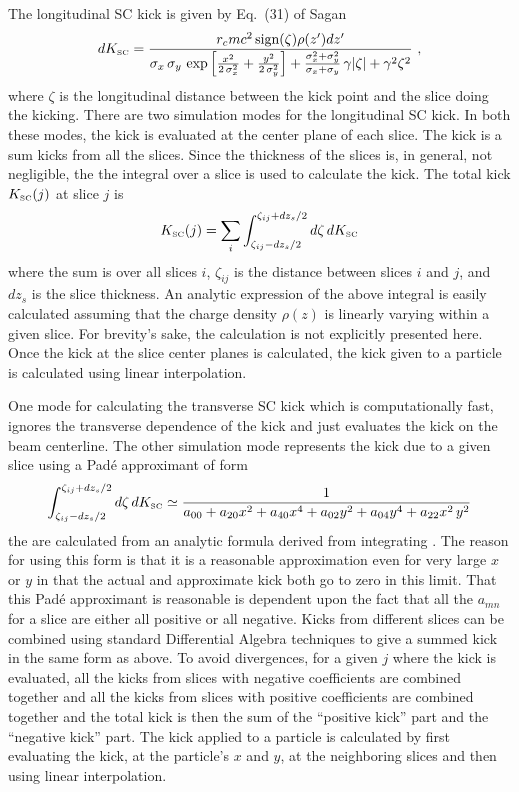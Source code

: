 The longitudinal SC kick is given by Eq.~(31) of Sagan\cite{b:csr} 
\begin{equation}
 d K_{\mbox{\tiny SC}} =
  \frac{ r_c m c^2 \, \mbox{sign}(\zeta)\rho(z')dz'}
  {\sigma_x \, \sigma_y \, \exp
  \left[ \frac{x^2}{2 \, \sigma_x^2} + \frac{y^2}{2 \, \sigma_y^2} \right] +
  \frac{\sigma_x^2 + \sigma_y^2}{\sigma_x + \sigma_y} \, \gamma |\zeta| + \gamma^2\zeta^2}\ ,
  \label{kelsz}
\end{equation}
where $\zeta$ is the longitudinal distance between the kick point and the slice doing the kicking.
There are two simulation modes for the longitudinal SC kick. In both these modes, the kick is
evaluated at the center plane of each slice. The kick is a sum kicks from all the slices. Since the
thickness of the slices is, in general, not negligible, the the integral over a slice is used to
calculate the kick. The total kick $K_{\mbox{\tiny SC}}(j)$ at slice $j$ is
\begin{equation}
  K_{\mbox{\tiny SC}} (j) = 
  \sum_i \int_{\zeta_{ij}-dz_s/2}^{\zeta_{ij}+dz_s/2} d\zeta \, dK_{\mbox{\tiny SC}}
\end{equation}
where the sum is over all slices $i$, $\zeta_{ij}$ is the distance between slices $i$ and $j$, and
$dz_s$ is the slice thickness. An analytic expression of the above integral is easily
calculated assuming that the charge density $\rho(z)$ is linearly varying within a given slice.  For
brevity's sake, the calculation is not explicitly presented here. Once the kick at the slice center
planes is calculated, the kick given to a particle is calculated using linear interpolation.

One mode for calculating the transverse SC kick which is computationally fast, ignores the
transverse dependence of the kick and just evaluates the kick on the beam centerline. The other
simulation mode represents the kick due to a given slice using a Pad{\'e} approximant of form
\begin{equation}
  \int_{\zeta_{ij}-dz_s/2}^{\zeta_{ij}+dz_s/2} d\zeta \, dK_{\mbox{\tiny SC}}
  \simeq \frac{1}{a_{00} + a_{20} x^2 + a_{40} x^4 + a_{02} y^2 + a_{04} y^4 + a_{22} x^2 \, y^2}
\end{equation}
the  are calculated from an analytic formula derived from integrating . The
reason for using this form is that it is a reasonable approximation even for very large $x$ or $y$
in that the actual and approximate kick both go to zero in this limit. That this Pad{\'e}
approximant is reasonable is dependent upon the fact that all the $a_{mn}$ for a slice are either
all positive or all negative. Kicks from different slices can be combined using standard
Differential Algebra techniques to give a summed kick in the same form as above. To avoid
divergences, for a given $j$ where the kick is evaluated, all the kicks from slices with negative
coefficients are combined together and all the kicks from slices with positive coefficients are
combined together and the total kick is then the sum of the ``positive kick'' part and the
``negative kick'' part. The kick applied to a particle is calculated by first evaluating the kick,
at the particle's $x$ and $y$, at the neighboring slices and then using linear interpolation.

